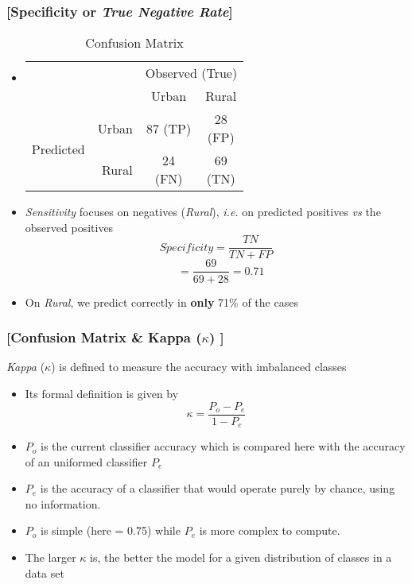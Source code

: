 \documentclass[xcolor=x11names,compress, handhouts]{beamer}
\renewcommand{\(}{\begin{columns}}
\renewcommand{\)}{\end{columns}}
\newcommand{\<}[1]{\begin{column}{#1}}
\renewcommand{\>}{\end{column}}
\begin{document}
\begin{frame} %
\frametitle{\textcolor{brique}{[Specificity or \textit{True Negative Rate}]}}
\begin{itemize}[<+->]
  \item[]
    \begin{table}[]
    \begin{tabular}{l r|c|c|}

                              & & \multicolumn{2}{c|}{Observed (True)}                                                                                          \\
                              & &    Urban  &  Rural  \\  \hline
    \multirow{2}{*}{Predicted}& Urban & \shortstack[c]{$87$ \\ \tiny{(TP)}}& \shortstack[c]{28 \\ \tiny{(FP)}} \\ \cline{2-4}
                              & Rural &  \shortstack[c]{24 \\ \tiny{(FN)}}& \shortstack[c]{69 \\ \tiny{(TN)}} \\ \hline
    \end{tabular}
    \caption{Confusion Matrix}
    \end{table}
  \item \textit{Sensitivity} focuses on  negatives (\textit{Rural}), \textit{i.e.} on predicted positives \textit{vs} the observed positives 
   $$ Specificity = \frac{TN}{TN + FP} $$
   $$
 \; \; \;  =  \frac{69}{69+28} = 0.71
 $$
  \item On \textit{Rural}, we predict correctly in \textbf{only} 71\% of the cases
\end{itemize}
\end{frame}

\begin{frame} %
\frametitle{\textcolor{brique}{[Confusion Matrix  \& Kappa ($\kappa$) ]}}
\emph{Kappa} ($\kappa$) is defined to measure the accuracy with imbalanced classes
\begin{itemize}[<+->]
  \item[] Its formal definition is given by 
  $$ \kappa = \frac{P_o - P_e}{1 - P_e}  $$
  \item[]$P_o$ is the current classifier accuracy which is compared here with the accuracy of an uniformed classifier $P_e$
  \item[] $P_e$ is the accuracy of a classifier that would operate purely by chance, using no information.
  \item $P_o$ is simple (here = 0.75) while  $P_e$  is more complex to compute. 
  \item  The larger $\kappa $ is, the better the model for a given distribution of classes in a data set
  \end{itemize}
\end{frame}
\end{document}
